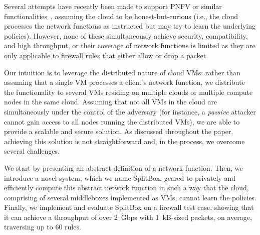 \RequirePackage{fix-cm} \let\oldvec\vec \documentclass{sig-alternate-05-2015}
\begin{document}
Several attempts have recently been made to support PNFV or similar functionalities~\cite{bf-firewall, mlm-firewall, central-pnfv, embark}, assuming the cloud to be honest-but-curious (i.e., the cloud processes the network functions as instructed but may try to learn the underlying policies). However, none of these simultaneously achieve
security, compatibility, and high throughput, or their coverage of network functions is limited as they are only applicable to firewall rules that either allow or drop a packet. 

Our intuition is to leverage the distributed nature of cloud VMs: rather than assuming that a single VM processes a client's network function, we distribute the functionality to several VMs residing on multiple clouds or multiple compute nodes in the same cloud. Assuming that not all VMs in the cloud are simultaneously under the control of the adversary (for instance, a \emph{passive} attacker cannot gain access to all nodes running the distributed VMs), we are able to provide a scalable and secure solution. As discussed throughout the paper, achieving this solution is not straightforward and, in the process, we overcome several challenges.

We start by presenting an abstract definition of a network function. Then, we introduce a novel system, which we name SplitBox, geared to privately and efficiently compute this abstract network function in such a way that the cloud, comprising of several middleboxes implemented as VMs, cannot learn the policies. Finally, we implement and evaluate SplitBox on a firewall test case, showing that it can achieve 
a throughput of over 2~Gbps with 1~kB-sized packets, on average, traversing up to 60 rules.
\end{document}
